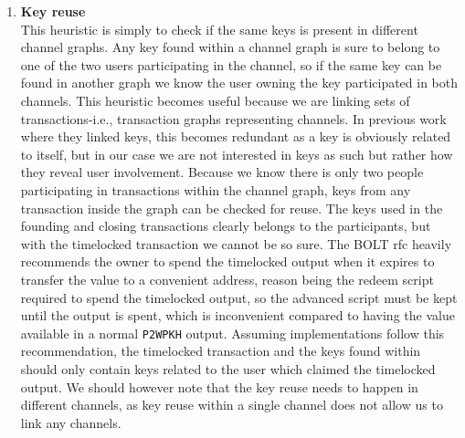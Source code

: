 \begin{enumerate}

    \item \textbf{Key reuse}\\
This heuristic is simply to check if the same keys is present in different channel graphs.  
Any key found within a channel graph is sure to belong to one of the two users participating in the channel, so if the same key can be found in another graph we know the user owning the key participated in both channels.
This heuristic becomes useful because we are linking sets of transactions-i.e., transaction graphs representing channels. In previous work where they linked keys, this becomes redundant as a key is obviously related to itself, but in our case we are not interested in keys as such but rather how they reveal user involvement. Because we know there is only two people participating in transactions within the channel graph, keys from any transaction inside the graph can be checked for reuse. The keys used in the founding and closing transactions clearly belongs to the participants, but with the timelocked transaction we cannot be so sure. The BOLT rfc \cite{bolt5} heavily recommends the owner to spend the timelocked output when it expires to transfer the value to a convenient address, reason being the redeem script required to spend the timelocked output, so the advanced script must be kept until the output is spent, which is inconvenient compared to having the value available in a normal {\tt P2WPKH} output.
Assuming implementations follow this recommendation, the timelocked transaction and the keys found within should only contain keys related to the user which claimed the timelocked output. We should however note that the key reuse needs to happen in different channels, as key reuse within a single channel does not allow us to link any channels.
\\


\end{enumerate}
